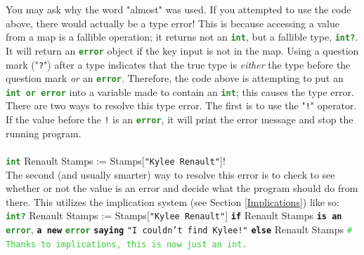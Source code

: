 \documentclass{article}
\newcommand{\codecomment}[1]{\texttt{\textcolor{LimeGreen}{#1}}}
\newcommand{\commentline}[1]{\codecomment{\# #1}}
\newcommand{\type}[1]{\texttt{\textcolor{ForestGreen}{\textbf{#1}}}}
\newcommand{\common}[1]{\texttt{\textcolor{Mulberry}{\textbf{#1}}}}
\newcommand{\codestring}[1]{\texttt{\textcolor{NavyBlue}{"#1"}}}
\newenvironment{code}[0]
{\ttfamily{}				%
\setlength\parindent{0cm}	%
~\\}
{\setlength\parindent{1cm}
~\\}
\begin{document}
\indent You may ask why the word "almost" was used. If you attempted to use the code above, there would actually be a type error! This is because accessing a value from a map is a fallible operation; it returns not an \type{int}, but a fallible type, \type{int?}. It will return an \type{error} object if the key input is not in the map. Using a question mark ("\texttt{?}") after a type indicates that the true type is \textit{either} the type before the question mark \textit{or} an \type{error}. Therefore, the code above is attempting to put an \type{int or error} into a variable made to contain an \type{int}; this causes the type error.\\
\indent There are two ways to resolve this type error. The first is to use the "\texttt{!}" operator. If the value before the \texttt{!} is an \type{error}, it will print the error message and stop the running program.\\
\begin{code}
\type{int} Renault Stamps := Stamps[\codestring{Kylee Renault}]!
\end{code}
\indent The second (and usually smarter) way to resolve this error is to check to see whether or not the value is an error and decide what the program should do from there. This utilizes the implication system (see Section \ref{Implications}) like so:
\begin{code}
\type{int?} Renault Stamps := Stamps[\codestring{Kylee Renault}]
\common{if} Renault Stamps \common{is an} \type{error},
\qquad{}\common{a new} \type{error} \common{saying} \codestring{I couldn't find Kylee!}
\common{else}
\qquad{}Renault Stamps	\commentline{Thanks to implications, this is now just an int.}
\end{code}
\end{document}
